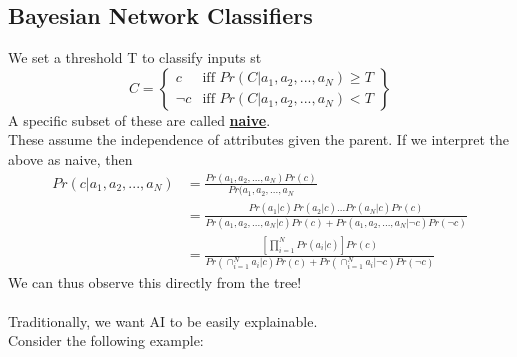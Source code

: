 \documentclass[../../lecture_notes.tex]{subfiles}
\begin{document}
\subsection*{Bayesian Network Classifiers}
\begin{center}\end{center}
\noindent We set a threshold T to classify inputs st 
	\[ C = \left\{ \begin{array}{lr} 
		c & \text{iff } Pr(C|a_1, a_2, ..., a_N) \geq T\\
		\neg c & \text{iff } Pr(C|a_1, a_2, ..., a_N) < T
	\end{array} \right\} \]
\noindent A specific subset of these are called \textbf{\underline{naive}}.\\
These assume the independence of attributes given the parent.
If we interpret the above as naive, then\begin{align*} Pr(c|a_1, a_2, ..., a_N)
	&= \frac {Pr(a_1, a_2, ..., a_N) Pr(c)} {Pr(a_1, a_2, ..., a_N}\\
	&= \frac {Pr(a_1|c) Pr(a_2|c) ... Pr(a_N|c) Pr(c)} 
		{Pr(a_1, a_2, ..., a_N | c) Pr(c) + Pr(a_1, a_2, ..., a_N | \neg c) Pr(\neg c)}\\
	&= \frac {\left[\prod_{i=1}^N Pr(a_i | c)\right] Pr(c)} 
		{Pr(\cap_{i=1}^N a_i | c) Pr(c)  + Pr(\cap_{i=1}^N a_i |\neg c) Pr(\neg c)}
\end{align*}
\noindent We can thus observe this directly from the tree!\\
\\
Traditionally, we want AI to be easily explainable.\\
Consider the following example:\\
\end{document}

